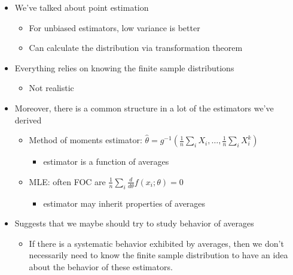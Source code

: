 \begin{itemize}
\item We've talked about point estimation
\begin{itemize}
\item For unbiased estimators, low variance is better
\item Can calculate the distribution via transformation theorem
\end{itemize}
\item Everything relies on knowing the finite sample distributions
\begin{itemize}
\item Not realistic
\end{itemize}
\item Moreover, there is a common structure in a lot of the estimators
       we've derived
\begin{itemize}
\item Method of moments estimator: $\hat\theta =
         g^{-1}(\frac{1}{n}\sum_i X_i, \dots, \frac{1}{n} \sum_i X_i^k)$
\begin{itemize}
\item estimator is a function of averages
\end{itemize}
\item MLE: often FOC are $\frac{1}{n} \sum_i \frac{d}{d\theta}
         f(x_i; \theta) = 0$
\begin{itemize}
\item estimator may inherit properties of averages
\end{itemize}
\end{itemize}
\item Suggests that we maybe should try to study behavior of averages
\begin{itemize}
\item If there is a systematic behavior exhibited by averages, then
         we don't necessarily need to know the finite sample
         distribution to have an idea about the behavior of these estimators.
\end{itemize}
\end{itemize}


